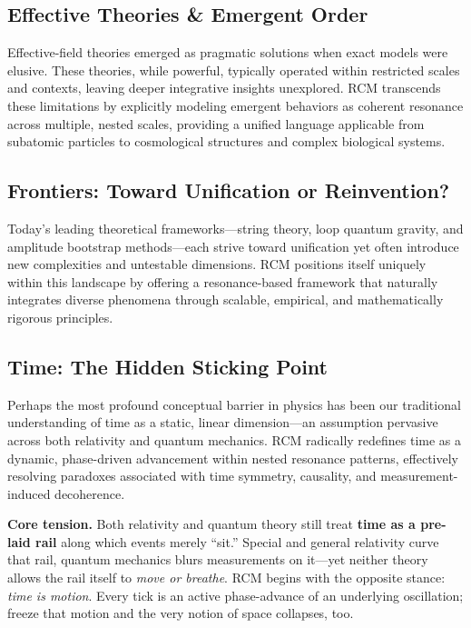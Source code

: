 \subsection{Effective Theories \& Emergent Order}\label{subsec:effective-theories-emergent-order}
Effective-field theories emerged as pragmatic solutions when exact models were elusive. These theories, while powerful, typically operated within restricted scales and contexts, leaving deeper integrative insights unexplored. RCM transcends these limitations by explicitly modeling emergent behaviors as coherent resonance across multiple, nested scales, providing a unified language applicable from subatomic particles to cosmological structures and complex biological systems.

\subsection{Frontiers: Toward Unification or Reinvention?}\label{subsec:frontiers-toward-unification-or-reinvention}
Today’s leading theoretical frameworks—string theory, loop quantum gravity, and amplitude bootstrap methods—each strive toward unification yet often introduce new complexities and untestable dimensions. RCM positions itself uniquely within this landscape by offering a resonance-based framework that naturally integrates diverse phenomena through scalable, empirical, and mathematically rigorous principles.

\subsection{Time: The Hidden Sticking Point}\label{subsec:time-the-hidden-sticking-point}

Perhaps the most profound conceptual barrier in physics has been our traditional understanding of time as a static, linear dimension—an assumption pervasive across both relativity and quantum mechanics. RCM radically redefines time as a dynamic, phase-driven advancement within nested resonance patterns, effectively resolving paradoxes associated with time symmetry, causality, and measurement-induced decoherence.

\begin{concept}
\textbf{Core tension.}  
Both relativity and quantum theory still treat \textbf{time as a
pre-laid rail} along which events merely “sit.”  
Special and general relativity curve that rail, quantum mechanics blurs
measurements on it—yet neither theory allows the rail itself to \emph{move
or breathe}.  
RCM begins with the opposite stance: \emph{time is motion}.  
Every tick is an active phase-advance of an underlying oscillation; freeze
that motion and the very notion of space collapses, too.
\end{concept}

